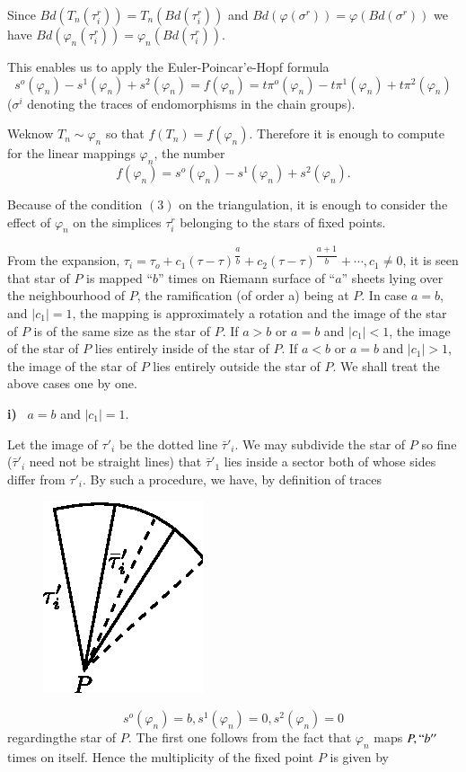   Since $Bd (T_n (\tau^r_i)) = T_n (Bd (\tau^r_i))$ and $Bd (\varphi
  (\sigma^r)) = \varphi (Bd (\sigma^r))$ we have $Bd (\varphi_n
  (\tau^r_i)) = \varphi_n (Bd (\tau^r_i))$. 
  
  This enables us to apply the Euler-Poincar'e-Hopf formula
  $$
  s^o (\varphi_n) - s^1 (\varphi_n) + s^2 (\varphi_n) = f(\varphi_n) = t
  \pi^o (\varphi_n) - t \pi^1 (\varphi_n) + t \pi^2 (\varphi_n) 
  $$
  ($\sigma^i$ denoting the traces of endomorphisms in the chain groups).

We\pageoriginale know $T_n \sim \varphi_n$ so that $f(T_n) =
f(\varphi_n)$. Therefore it is enough to compute for the linear
mappings $\varphi_n$, the number 
$$ 
f(\varphi_n) = s^o (\varphi_n) - s^1 (\varphi_n) + s^2 (\varphi_n).
$$

Because of the condition $(3)$ on the triangulation, it is enough to
consider the effect of $\varphi_n$ on the simplices $\tau^r_i$
belonging to the stars of fixed points. 

From the expansion, $\tau_i = \tau_o + c_1 (\tau -
\tau)^{\dfrac{a}{b}} + c_2 (\tau - \tau)^{\dfrac{a + 1}{b}} + \cdots,
c_1 \neq 0$, it is seen that star of $P$ is mapped ``$b$'' times on
Riemann surface of ``$a$'' sheets lying over the neighbourhood of
$P$, the ramification (of order a) being at $P$. In case $a = b$, and
$|c_1| = 1$, the mapping is approximately a rotation and the image of
the star of $P$ is of the same size as the star of $P$. If $a > b$ or
$a = b$ and $|c_1| < 1$, the image of the star of $P$ lies entirely
inside of the star of $P$. If $a < b$ or $a = b$ and $|c_1| > 1$, the
image of the star of $P$ lies entirely outside the star of $P$. We
shall treat the above cases one by one. 

\noindent
\textbf { i)} ~$a = b$ and $|c_1| = 1$.

  Let the image of $\tau'_i$ be the dotted line $\bar{\tau}'_i$. We
  may subdivide the star of $P$ so fine ($\bar{\tau}'_i$ need not be
  straight lines) that $\bar{\tau}'_1$ lies inside a sector both of
  whose sides differ from $\tau'_i$. By such a procedure, we have, by
  definition of traces 
   \begin{figure}[H]
    \centerline{\includegraphics{vol9-figures/fig9-18.eps}}
  \end{figure}
$$
s^o (\varphi_n) = b, s^1 (\varphi_n) = 0, s^2 (\varphi_n) = 0
$$
regarding\pageoriginale the star of $P$. The first one follows from the fact that
$\varphi_n$ maps $P, ``b''$ times on itself. Hence the multiplicity of
the fixed point $P$ is given by  

